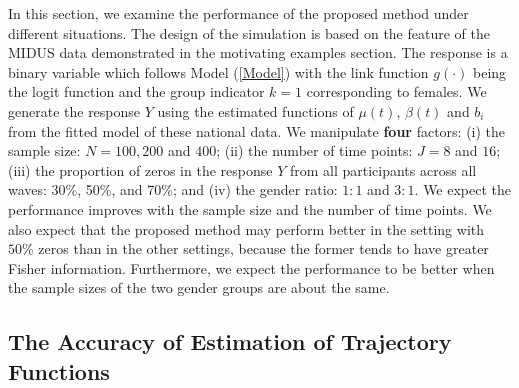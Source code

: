 In this section, we examine the performance of the proposed method
under different situations. The design of the simulation is based
on the feature of the MIDUS data demonstrated in the motivating
examples section. The response is a binary variable which follows
Model (\ref{Model}) with the link function $g(\cdot)$ being the
logit function and the group indicator $k=1$ corresponding to
females. We generate the response $Y$ using the estimated
functions of $\mu(t)$, $\beta(t)$ and $b_i$ from the fitted model
of these national data. We manipulate \textbf{four} factors: (i)
the sample size: $N=100, 200$ and $400$; (ii) the number of time
points: $J=8$ and $16$; (iii) the proportion of zeros in the
response $Y$ from all participants across all waves: 30\%, 50\%,
and 70\%; and (iv) the gender ratio: $1:1$ and $3:1$. We expect
the performance improves with the sample size and the number of
time points. We also expect that the proposed method may perform
better in the setting with $50\%$ zeros than in the other
settings, because the former tends to have greater Fisher
information. Furthermore, we expect the performance to be better
when the sample sizes of the two gender groups are about the same.

\subsection{The Accuracy of Estimation of Trajectory Functions}

